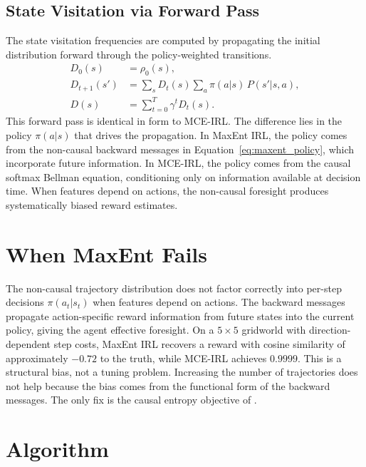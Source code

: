 \documentclass[10pt]{article}
\begin{document}
\subsection{State Visitation via Forward Pass}

The state visitation frequencies are computed by propagating the initial distribution forward through the policy-weighted transitions.
\begin{align}
D_0(s) &= \rho_0(s), \label{eq:forward_init} \\
D_{t+1}(s') &= \sum_s D_t(s) \sum_a \pi(a|s)\, P(s'|s,a), \label{eq:forward_step} \\
D(s) &= \sum_{t=0}^{T} \gamma^t D_t(s). \label{eq:forward_total}
\end{align}
This forward pass is identical in form to MCE-IRL. The difference lies in the policy $\pi(a|s)$ that drives the propagation. In MaxEnt IRL, the policy comes from the non-causal backward messages in Equation~\eqref{eq:maxent_policy}, which incorporate future information. In MCE-IRL, the policy comes from the causal softmax Bellman equation, conditioning only on information available at decision time. When features depend on actions, the non-causal foresight produces systematically biased reward estimates.


\section{When MaxEnt Fails}

The non-causal trajectory distribution does not factor correctly into per-step decisions $\pi(a_t|s_t)$ when features depend on actions. The backward messages propagate action-specific reward information from future states into the current policy, giving the agent effective foresight. On a $5 \times 5$ gridworld with direction-dependent step costs, MaxEnt IRL recovers a reward with cosine similarity of approximately $-0.72$ to the truth, while MCE-IRL achieves $0.9999$. This is a structural bias, not a tuning problem. Increasing the number of trajectories does not help because the bias comes from the functional form of the backward messages. The only fix is the causal entropy objective of \citet{ziebart2010}.


\section{Algorithm}
\end{document}
